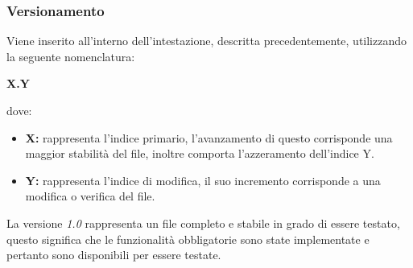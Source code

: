\subsubsection{Versionamento}
Viene inserito all'interno dell'intestazione, descritta precedentemente, utilizzando la seguente nomenclatura:
\begin{center}
	\textbf{X.Y}
\end{center}
dove:
\begin{itemize}
	\item \textbf{X:} rappresenta l'indice primario, l'avanzamento di questo corrisponde una maggior stabilità del file, inoltre comporta l'azzeramento dell'indice Y.
	\item \textbf{Y:} rappresenta l'indice di modifica, il suo incremento corrisponde a una modifica o verifica del file. 
\end{itemize}
La versione \textit{1.0} rappresenta un file completo e stabile in grado di essere testato, questo significa che le funzionalità obbligatorie sono state implementate e pertanto sono disponibili per essere testate.





